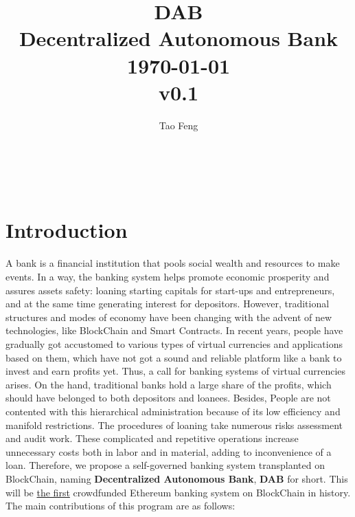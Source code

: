 \documentclass[a4paper, 10pt, conference]{ieeeconf} %
\title{\huge DAB\\[0.5em] \large Decentralized Autonomous Bank\\[1em]\today \\[1em] v0.1 }
\author{Tao Feng\\ \href{}{}  
\and \\ \href{}{}
\and \\ \href{}{} 
}
\begin{document}
\maketitle

\begin{abstract}

\end{abstract}



\tableofcontents
\thispagestyle{plain} %
\pagestyle{plain} %

\section{Introduction}
A bank is a financial institution that pools social wealth and resources to make events. In a way, the banking system helps promote economic prosperity and assures assets safety: loaning starting capitals for start-ups and entrepreneurs, and at the same time generating interest for depositors. However, traditional structures and modes of economy have been changing with the advent of new technologies, like BlockChain and Smart Contracts. In recent years, people have gradually got accustomed to various types of virtual currencies and applications based on them, which have not got a sound and reliable platform like a bank to invest and earn profits yet. Thus, a call for banking systems of virtual currencies arises.
On the hand, traditional banks hold a large share of the profits, which should have belonged to both depositors and loanees. Besides, People are not contented with this hierarchical administration because of its low efficiency and manifold restrictions. The procedures of loaning take numerous risks assessment and audit work. These complicated and repetitive operations increase unnecessary costs both in labor and in material, adding to inconvenience of a loan. 
Therefore, we propose a self-governed banking system transplanted on BlockChain, naming \textbf{Decentralized Autonomous Bank}, \textbf{DAB} for short. 
This will be \underline{the first} crowdfunded Ethereum banking system on BlockChain in history. The main contributions of this program are as follows:
\end{document}
